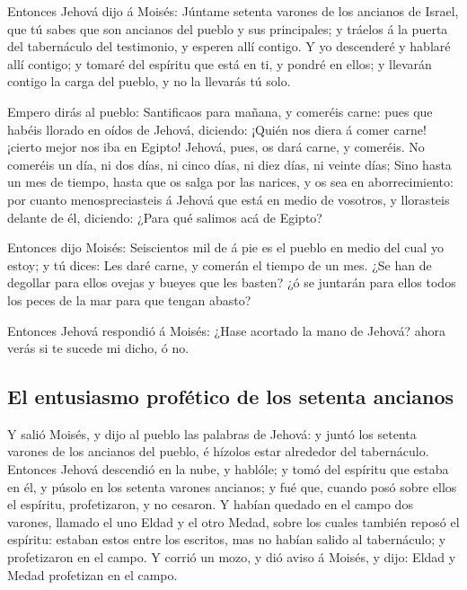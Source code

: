  Entonces Jehová dijo á Moisés: Júntame setenta varones
de los ancianos de Israel, que tú sabes que son ancianos del pueblo y
sus principales; y tráelos á la puerta del tabernáculo del testimonio, y
esperen allí contigo.  Y yo descenderé y hablaré allí
contigo; y tomaré del espíritu que está en ti, y pondré en ellos; y
llevarán contigo la carga del pueblo, y no la llevarás tú solo.

 Empero dirás al pueblo: Santificaos para mañana, y
comeréis carne: pues que habéis llorado en oídos de Jehová, diciendo:
¡Quién nos diera á comer carne! ¡cierto mejor nos iba en Egipto! Jehová,
pues, os dará carne, y comeréis.  No comeréis un día, ni
dos días, ni cinco días, ni diez días, ni veinte días; 
Sino hasta un mes de tiempo, hasta que os salga por las narices, y os
sea en aborrecimiento: por cuanto menospreciasteis á Jehová que está en
medio de vosotros, y llorasteis delante de él, diciendo: ¿Para qué
salimos acá de Egipto?

 Entonces dijo Moisés: Seiscientos mil de á pie es el
pueblo en medio del cual yo estoy; y tú dices: Les daré carne, y comerán
el tiempo de un mes.  ¿Se han de degollar para ellos
ovejas y bueyes que les basten? ¿ó se juntarán para ellos todos los
peces de la mar para que tengan abasto?

 Entonces Jehová respondió á Moisés: ¿Hase acortado la
mano de Jehová? ahora verás si te sucede mi dicho, ó no.

\hypertarget{el-entusiasmo-profuxe9tico-de-los-setenta-ancianos}{%
\subsection{El entusiasmo profético de los setenta
ancianos}\label{el-entusiasmo-profuxe9tico-de-los-setenta-ancianos}}

 Y salió Moisés, y dijo al pueblo las palabras de Jehová:
y juntó los setenta varones de los ancianos del pueblo, é hízolos estar
alrededor del tabernáculo.  Entonces Jehová descendió en
la nube, y hablóle; y tomó del espíritu que estaba en él, y púsolo en
los setenta varones ancianos; y fué que, cuando posó sobre ellos el
espíritu, profetizaron, y no cesaron.  Y habían quedado
en el campo dos varones, llamado el uno Eldad y el otro Medad, sobre los
cuales también reposó el espíritu: estaban estos entre los escritos, mas
no habían salido al tabernáculo; y profetizaron en el campo.
 Y corrió un mozo, y dió aviso á Moisés, y dijo: Eldad y
Medad profetizan en el campo.

